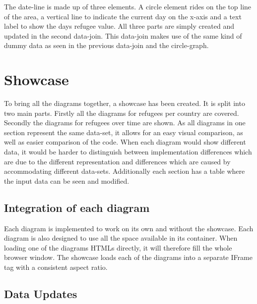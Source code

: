 The date-line is made up of three elements. A circle element rides on the top line of the area, a vertical line to indicate the current day on the x-axis and a text label to show the days refugee value. All three parts are simply created and updated in the second data-join. This data-join makes use of the same kind of dummy data as seen in the previous data-join and the circle-graph.


\section{Showcase}

To bring all the diagrams together, a showcase has been created. It  is split into two main parts. Firstly all the diagrams for refugees per country are covered. Secondly the diagrams for refugees over time are shown. As all diagrams in one section represent the same data-set, it allows for an easy visual comparison, as well as easier comparison of the code. When each diagram would show different data, it would be harder to distinguish between implementation differences which are due to the different representation and differences which are caused by accommodating different data-sets. Additionally each section has a table where the input data can be seen and modified.

\subsection{Integration of each diagram}

Each diagram is implemented to work on its own and without the showcase. Each diagram is also designed to use all the space available in its container. When loading one of the diagrams HTMLs directly, it will therefore fill the whole browser window. The showcase loads each of the diagrams into a separate IFrame tag with a consistent aspect ratio.

\subsection{Data Updates}

